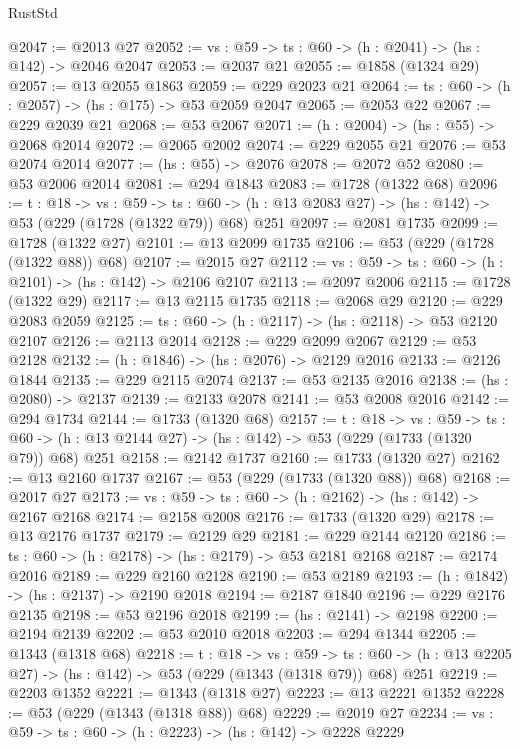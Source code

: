 \begin{lexlean}{RustStd}
\begin{coremodule}
@2047 := @2013 @27
@2052 := {vs : @59} -> {ts : @60} -> (h : @2041) -> (hs : @142) -> @2046 @2047
@2053 := @2037 @21
@2055 := @1858 (@1324 @29)
@2057 := @13 @2055 @1863
@2059 := @229 @2023 @21
@2064 := {ts : @60} -> (h : @2057) -> (hs : @175) -> @53 @2059 @2047
@2065 := @2053 @22
@2067 := @229 @2039 @21
@2068 := @53 @2067
@2071 := (h : @2004) -> (hs : @55) -> @2068 @2014
@2072 := @2065 @2002
@2074 := @229 @2055 @21
@2076 := @53 @2074 @2014
@2077 := (hs : @55) -> @2076
@2078 := @2072 @52
@2080 := @53 @2006 @2014
@2081 := @294 @1843
@2083 := @1728 (@1322 @68)
@2096 := {t : @18} ->
  {vs : @59} ->
  {ts : @60} -> (h : @13 @2083 @27) -> (hs : @142) -> @53 (@229 (@1728 (@1322 @79)) @68) @251
@2097 := @2081 @1735
@2099 := @1728 (@1322 @27)
@2101 := @13 @2099 @1735
@2106 := @53 (@229 (@1728 (@1322 @88)) @68)
@2107 := @2015 @27
@2112 := {vs : @59} -> {ts : @60} -> (h : @2101) -> (hs : @142) -> @2106 @2107
@2113 := @2097 @2006
@2115 := @1728 (@1322 @29)
@2117 := @13 @2115 @1735
@2118 := @2068 @29
@2120 := @229 @2083 @2059
@2125 := {ts : @60} -> (h : @2117) -> (hs : @2118) -> @53 @2120 @2107
@2126 := @2113 @2014
@2128 := @229 @2099 @2067
@2129 := @53 @2128
@2132 := (h : @1846) -> (hs : @2076) -> @2129 @2016
@2133 := @2126 @1844
@2135 := @229 @2115 @2074
@2137 := @53 @2135 @2016
@2138 := (hs : @2080) -> @2137
@2139 := @2133 @2078
@2141 := @53 @2008 @2016
@2142 := @294 @1734
@2144 := @1733 (@1320 @68)
@2157 := {t : @18} ->
  {vs : @59} ->
  {ts : @60} -> (h : @13 @2144 @27) -> (hs : @142) -> @53 (@229 (@1733 (@1320 @79)) @68) @251
@2158 := @2142 @1737
@2160 := @1733 (@1320 @27)
@2162 := @13 @2160 @1737
@2167 := @53 (@229 (@1733 (@1320 @88)) @68)
@2168 := @2017 @27
@2173 := {vs : @59} -> {ts : @60} -> (h : @2162) -> (hs : @142) -> @2167 @2168
@2174 := @2158 @2008
@2176 := @1733 (@1320 @29)
@2178 := @13 @2176 @1737
@2179 := @2129 @29
@2181 := @229 @2144 @2120
@2186 := {ts : @60} -> (h : @2178) -> (hs : @2179) -> @53 @2181 @2168
@2187 := @2174 @2016
@2189 := @229 @2160 @2128
@2190 := @53 @2189
@2193 := (h : @1842) -> (hs : @2137) -> @2190 @2018
@2194 := @2187 @1840
@2196 := @229 @2176 @2135
@2198 := @53 @2196 @2018
@2199 := (hs : @2141) -> @2198
@2200 := @2194 @2139
@2202 := @53 @2010 @2018
@2203 := @294 @1344
@2205 := @1343 (@1318 @68)
@2218 := {t : @18} ->
  {vs : @59} ->
  {ts : @60} -> (h : @13 @2205 @27) -> (hs : @142) -> @53 (@229 (@1343 (@1318 @79)) @68) @251
@2219 := @2203 @1352
@2221 := @1343 (@1318 @27)
@2223 := @13 @2221 @1352
@2228 := @53 (@229 (@1343 (@1318 @88)) @68)
@2229 := @2019 @27
@2234 := {vs : @59} -> {ts : @60} -> (h : @2223) -> (hs : @142) -> @2228 @2229

\end{coremodule}
\end{lexlean}
